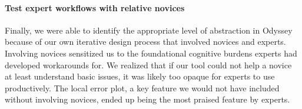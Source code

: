 \paragraph{Test expert workflows with relative novices}
Finally, we were able to identify the appropriate level of abstraction in Odyssey because of our own iterative design process that involved novices and experts. 
  Involving novices sensitized us to the foundational cognitive burdens experts had developed workarounds for. 
We realized that if our tool could not help a novice at least understand basic issues,
  it was likely too opaque for experts to use productively.
The local error plot, a key feature we would not have included without involving novices, ended up being the most praised feature by experts.


